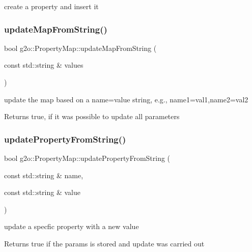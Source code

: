 create a property and insert it \mbox{\label{classg2o_1_1_property_map_a0407e6a72afafd608f13cfdffc6ffc06}} 
\subsubsection{\texorpdfstring{update\+Map\+From\+String()}{updateMapFromString()}}
{\footnotesize\ttfamily bool g2o\+::\+Property\+Map\+::update\+Map\+From\+String (\begin{DoxyParamCaption}\item[{const std\+::string \&}]{values }\end{DoxyParamCaption})}

update the map based on a name=value string, e.\+g., name1=val1,name2=val2 \begin{DoxyReturn}{Returns}
true, if it was possible to update all parameters 
\end{DoxyReturn}
\mbox{\label{classg2o_1_1_property_map_a43df66ba15f9425abbd0e888a7b67251}} 
\subsubsection{\texorpdfstring{update\+Property\+From\+String()}{updatePropertyFromString()}}
{\footnotesize\ttfamily bool g2o\+::\+Property\+Map\+::update\+Property\+From\+String (\begin{DoxyParamCaption}\item[{const std\+::string \&}]{name,  }\item[{const std\+::string \&}]{value }\end{DoxyParamCaption})}

update a specfic property with a new value \begin{DoxyReturn}{Returns}
true if the params is stored and update was carried out 
\end{DoxyReturn}
\mbox{\label{classg2o_1_1_property_map_aa4ad984887fe56189f7e214f9760f161}} 
